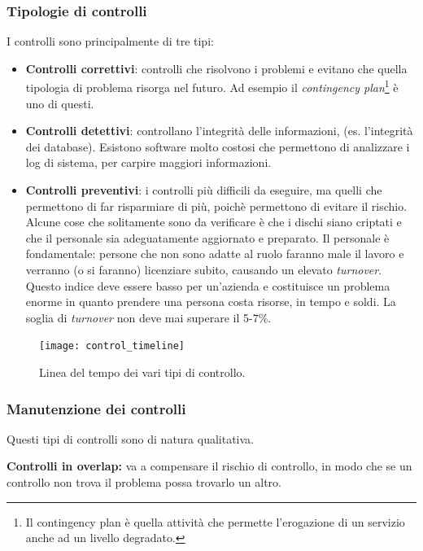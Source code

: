 \subsubsection{Tipologie di controlli}

I controlli sono principalmente di tre tipi:

\begin{itemize}
\item \textbf{Controlli correttivi}: controlli che risolvono i problemi e
evitano che quella tipologia di problema risorga nel futuro. Ad esempio il
\textit{contingency plan}\footnote{Il contingency plan è quella
attività che permette l'erogazione di un servizio anche ad un livello
degradato.} è uno di questi.

\item \textbf{Controlli detettivi}: controllano l'integrità delle
informazioni, (es. l'integrità dei database). Esistono software
molto costosi che permettono di analizzare i log di sistema, per carpire
maggiori informazioni.

\item \textbf{Controlli preventivi}: i controlli più difficili da eseguire, ma
quelli che permettono di far risparmiare di più, poichè permettono di evitare
il rischio. Alcune cose che solitamente sono da verificare è che i dischi siano
criptati e che il personale sia adeguatamente aggiornato e preparato.
Il personale è fondamentale: persone che non sono adatte al ruolo faranno male
il lavoro e verranno (o si faranno) licenziare subito, causando un
elevato \textit{turnover}. Questo indice deve essere basso per un'azienda e
costituisce un problema enorme in quanto prendere una persona costa risorse, in
tempo e soldi. La soglia di \textit{turnover} non deve mai superare il 5-7\%.
\end{itemize}

\begin{figure}[H]
	\begin{center}
\texttt{[image: control\_timeline]}
	\end{center}
	\caption{Linea del tempo dei vari tipi di controllo.}
\end{figure}


\subsubsection{Manutenzione dei controlli}

Questi tipi di controlli sono di natura qualitativa.

\textbf{Controlli in overlap:} va a compensare il rischio di controllo, in modo
che se un controllo non trova il problema possa trovarlo un altro.

